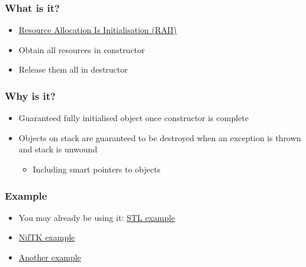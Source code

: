 \subsubsection{What is it?}\label{what-is-it}

\begin{itemize}
\itemsep1pt\parskip0pt
\item
  \href{https://en.wikipedia.org/wiki/Resource_Acquisition_Is_Initialization}{Resource
  Allocation Is Initialisation (RAII)}
\item
  Obtain all resources in constructor
\item
  Release them all in destructor
\end{itemize}

\subsubsection{Why is it?}\label{why-is-it}

\begin{itemize}
\itemsep1pt\parskip0pt
\item
  Guaranteed fully initialised object once constructor is complete
\item
  Objects on stack are guaranteed to be destroyed when an exception is
  thrown and stack is unwound

  \begin{itemize}
  \itemsep1pt\parskip0pt
  \item
    Including smart pointers to objects
  \end{itemize}
\end{itemize}

\subsubsection{Example}\label{example}

\begin{itemize}
\itemsep1pt\parskip0pt
\item
  You may already be using it:
  \href{https://en.wikipedia.org/wiki/Resource_Acquisition_Is_Initialization}{STL
  example}
\item
  \href{https://cmiclab.cs.ucl.ac.uk/CMIC/NifTK/blob/2586-data-source-redesign/Code/Gui/MITK/Modules/IGIServices/niftkPointRegServiceRAII.cxx}{NifTK
  example}
\item
  \href{https://en.wikibooks.org/wiki/More_C\%2B\%2B_Idioms/Resource_Acquisition_Is_Initialization}{Another
  example}
\end{itemize}

